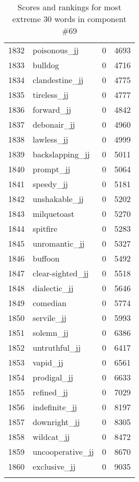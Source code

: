\begin{longtable}[!htbp]{| rlr@{.}l |}
    1832 & poisonous\_jj & 0 & 4693 \\
    1833 & bulldog & 0 & 4716 \\
    1834 & clandestine\_jj & 0 & 4775 \\
    1835 & tireless\_jj & 0 & 4777 \\
    1836 & forward\_jj & 0 & 4842 \\
    1837 & debonair\_jj & 0 & 4960 \\
    1838 & lawless\_jj & 0 & 4999 \\
    1839 & backslapping\_jj & 0 & 5011 \\
    1840 & prompt\_jj & 0 & 5064 \\
    1841 & speedy\_jj & 0 & 5181 \\
    1842 & unshakable\_jj & 0 & 5202 \\
    1843 & milquetoast & 0 & 5270 \\
    1844 & spitfire & 0 & 5283 \\
    1845 & unromantic\_jj & 0 & 5327 \\
    1846 & buffoon & 0 & 5492 \\
    1847 & clear-sighted\_jj & 0 & 5518 \\
    1848 & dialectic\_jj & 0 & 5646 \\
    1849 & comedian & 0 & 5774 \\
    1850 & servile\_jj & 0 & 5993 \\
    1851 & solemn\_jj & 0 & 6386 \\
    1852 & untruthful\_jj & 0 & 6417 \\
    1853 & vapid\_jj & 0 & 6561 \\
    1854 & prodigal\_jj & 0 & 6633 \\
    1855 & refined\_jj & 0 & 7029 \\
    1856 & indefinite\_jj & 0 & 8197 \\
    1857 & downright\_jj & 0 & 8305 \\
    1858 & wildcat\_jj & 0 & 8472 \\
    1859 & uncooperative\_jj & 0 & 8670 \\
    1860 & exclusive\_jj & 0 & 9035 \\
    \hline
    \caption{Scores and rankings for most extreme 30 words in component \#69} \\
\end{longtable}
